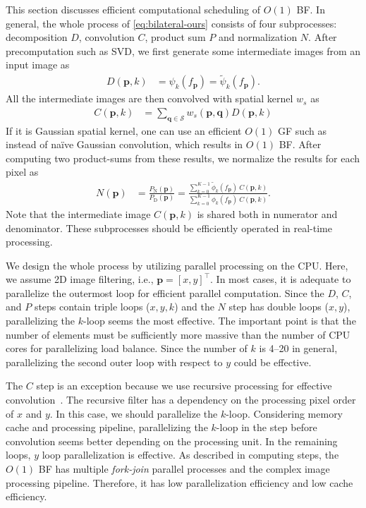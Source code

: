 \documentclass{article}
\begin{document}
This section discusses efficient computational scheduling of $O(1)$ BF.
In general, the whole process of \eqref{eq:bilateral-ours} consists of four subprocesses: decomposition $D$, convolution $C$, product sum $P$ and normalization $N$.
After precomputation such as SVD, we first generate some intermediate images from an input image as
\begin{align}
    D(\bm{p},k) &= \psi_k(f_{\bm{p}}) = \tilde{\psi}_k(f_{\bm{p}}).
\end{align}
All the intermediate images are then convolved with spatial kernel $w_s$ as
\begin{align}
    C(\bm{p},k) &= \sum_{\bm{q}\in\mathcal{S}} w_s(\bm{p},\bm{q}) D(\bm{p},k)
\end{align}
If it is Gaussian spatial kernel, one can use an efficient $O(1)$ GF such as ~\cite{sugimoto2013fast,sugimoto2015efficient,sugimoto2018universal} instead of na\"ive Gaussian convolution, which results in $O(1)$ BF.
After computing two product-sums from these results, we normalize the results for each pixel as
\begin{align}
    N(\bm{p}) &= \frac{P_\mathrm{N}(\bm{p})}{P_\mathrm{D}(\bm{p})}
        = \frac {\sum_{k=0}^{K-1} \tilde{\phi}_k(f_{\bm{p}})~C(\bm{p},k)}
                {\sum_{k=0}^{K-1} \phi_k(f_{\bm{p}})~C(\bm{p},k)}.
\end{align}
Note that the intermediate image $C(\bm{p},k)$ is shared both in numerator and denominator. These subprocesses should be efficiently operated in real-time processing.

We design the whole process by utilizing parallel processing on the CPU.
Here, we assume 2D image filtering, i.e., $\bm{p}=[x,y]^\top$.
In most cases, it is adequate to parallelize the outermost loop for efficient parallel computation.
Since the $D$, $C$, and $P$ steps contain triple loops ($x, y, k$) and the $N$ step has double loops ($x,y$), parallelizing the $k$-loop seems the most effective.
The important point is that the number of elements must be sufficiently more massive than the number of CPU cores for parallelizing load balance.
Since the number of $k$ is 4--20 in general, parallelizing the second outer loop with respect to $y$ could be effective.

The $C$ step is an exception because we use recursive processing for effective convolution~\cite{sugimoto2013fast,sugimoto2015efficient,sugimoto2018universal}.
The recursive filter has a dependency on the processing pixel order of $x$ and $y$.
In this case, we should parallelize the $k$-loop.
Considering memory cache and processing pipeline, parallelizing the $k$-loop in the step before convolution seems better depending on the processing unit.
In the remaining loops, $y$ loop parallelization is effective.
As described in computing steps, the $O(1)$ BF has multiple \textit{fork-join} parallel processes and the complex image processing pipeline.
Therefore, it has low parallelization efficiency and low cache efficiency.
\end{document}
